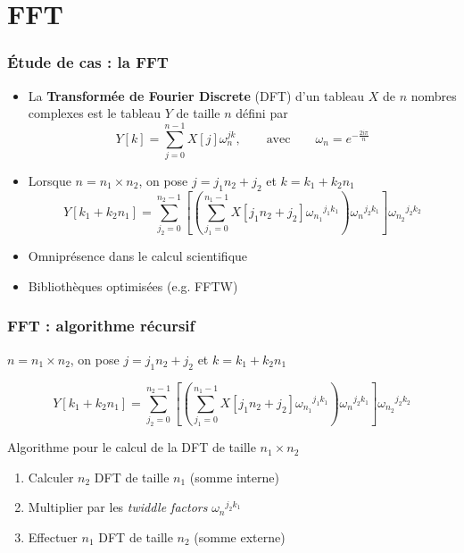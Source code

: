 \documentclass[xcolor={x11names,svgnames}]{beamer}
\begin{document}

\section{FFT}

\begin{frame}
  \frametitle{Étude de cas : la FFT}

  \begin{itemize}
  \item La \textbf{Transformée de Fourier Discrete} (DFT) d'un tableau $X$ de
    $n$ nombres complexes est le tableau $Y$ de taille $n$ défini par
\[
  Y[k] = \sum_{j=0}^{n-1} X[j] \omega_n^{jk}, \qquad \text{avec} \qquad \omega_n = e^{-\frac{2i\pi}{n}}
\]

\medskip

\item Lorsque $n = n_1 \times n_2$, on pose
$j = j_1 n_2 + j_2$ et $k = k_1 + k_2 n_1$ 
\[
Y[k_1 + k_2 n_1] = \sum_{j_2 = 0}^{n_2 - 1} \left[ \left( \sum_{j_1 = 0}^{n_1 - 1} X[j_1n_2 + j_2] {\omega_{n_1}}^{j_1 k_1} \right) {\omega_n}^{j_2 k_1} \right] {\omega_{n_2}}^{j_2 k_2}
\]

\item Omniprésence dans le calcul scientifique
\item Bibliothèques optimisées (e.g. FFTW)
\end{itemize}
\end{frame}


\begin{frame}
  \frametitle{FFT : algorithme récursif}

$n = n_1 \times n_2$, on pose $j = j_1 n_2 + j_2$ et $k = k_1 + k_2 n_1$ 

\[
Y[k_1 + k_2 n_1] = \sum_{j_2 = 0}^{n_2 - 1} \left[ \left( \sum_{j_1 = 0}^{n_1 - 1} X[j_1n_2 + j_2] {\omega_{n_1}}^{j_1 k_1} \right) {\omega_n}^{j_2 k_1} \right] {\omega_{n_2}}^{j_2 k_2}
\]
  
\begin{block}{Algorithme pour le calcul de la DFT de taille $n_1 \times n_2$}
  \begin{enumerate}
  \item Calculer $n_2$ DFT de taille $n_1$ (somme interne)
  \item Multiplier par les \emph{twiddle factors} ${\omega_n}^{j_2 k_1}$
  \item Effectuer $n_1$ DFT de taille $n_2$ (somme externe)
  \end{enumerate}
\end{block}

\end{frame}
\end{document}
